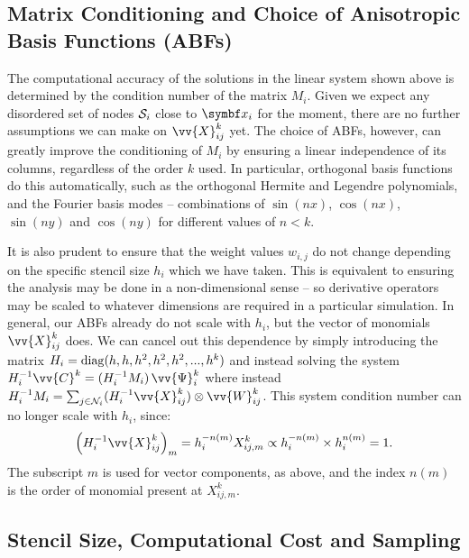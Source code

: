 \subsection{Matrix Conditioning and Choice of Anisotropic Basis Functions (ABFs)}

The computational accuracy of the solutions in the linear system shown above is determined by the condition number of the matrix $M_i$. Given we expect any disordered set of nodes $\cl{S}_i$ close to $\vb{x}_i$ for the moment, there are no further assumptions we can make on $\vv{X}^k_{ij}$ yet. The choice of ABFs, however, can greatly improve the conditioning of $M_i$ by ensuring a linear independence of its columns, regardless of the order $k$ used. In particular, orthogonal basis functions do this automatically, such as the orthogonal Hermite and Legendre polynomials, and the Fourier basis modes -- combinations of $\sin(nx)$, $\cos(nx)$, $\sin(ny)$ and $\cos(ny)$ for different values of $n < k$.

It is also prudent to ensure that the weight values $w_{i ,j}$ do not change depending on the specific stencil size $h_i$ which we have taken. This is equivalent to ensuring the analysis may be done in a non-dimensional sense -- so derivative operators may be scaled to whatever dimensions are required in a particular simulation. In general, our ABFs already do not scale with $h_i$, but the vector of monomials $\vv{X}^k_{ij}$ does. We can cancel out this dependence by simply introducing the matrix $H_i = \rm{diag}(h, h, h^2, h^2, h^2, ..., h^k)$ and instead solving the system $H_i^{-1} \vv{C}^k = (H_i^{-1} M_i) \, \vv{\Psi}^k_i$ where instead $H_i^{-1} M_i = \sum_{j \in \cl{N}_i} (H_i^{-1} \vv{X}^k_{ij}) \otimes \vv{W}^k_{ij}$. This system condition number can no longer scale with $h_i$, since:
\begin{equation}
\left( H_i^{-1} \vv{X}^k_{ij} \right)_m
= h_i^{-n(m)} X^k_{ij, m}
\propto h_i^{-n(m)} \times h_i^{n(m)} = 1.
\end{equation}
The subscript $m$ is used for vector components, as above, and the index $n(m)$ is the order of monomial present at $X^k_{ij, m}$.



\subsection{Stencil Size, Computational Cost and Sampling}

